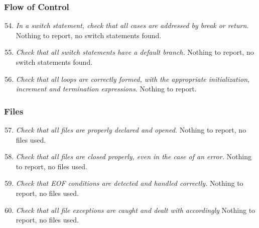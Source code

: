 	\subsubsection{Flow of Control}
		\begin{enumerate}
			\setcounter{enumi}{53}
			\item \textit{In a switch statement, check that all cases are addressed by break or return.}\newline
			Nothing to report, no switch statements found. %

			\item \textit{Check that all switch statements have a default branch.}\newline
			Nothing to report, no switch statements found. %

			\item \textit{Check that all loops are correctly formed, with the appropriate initialization, increment and termination expressions.}\newline
			Nothing to report. %
		\end{enumerate}

	\subsubsection{Files}
		\begin{enumerate}
			\setcounter{enumi}{56}
			\item \textit{Check that all files are properly declared and opened.}\newline
			Nothing to report, no files used. %

			\item \textit{Check that all files are closed properly, even in the case of an error.}\newline
			Nothing to report, no files used. %

			\item \textit{Check that EOF conditions are detected and handled correctly.}\newline
			Nothing to report, no files used. %

			\item \textit{Check that all file exceptions are caught and dealt with accordingly}\newline
			Nothing to report, no files used. %
		\end{enumerate}

















